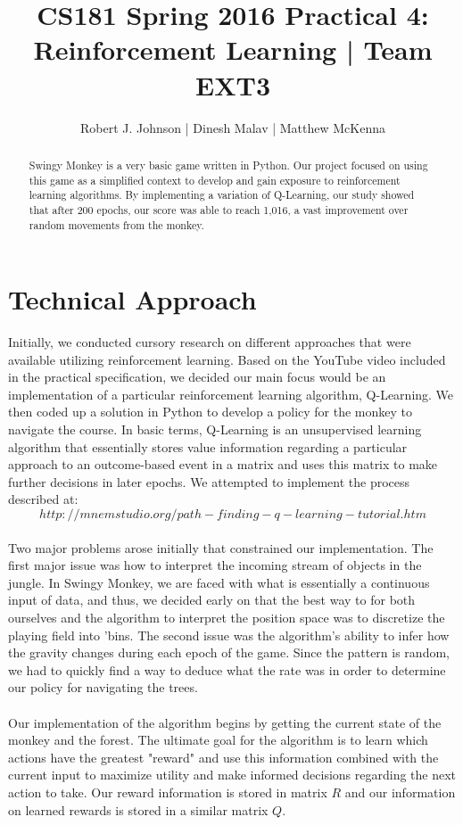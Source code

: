 \documentclass{article}
\begin{document}
\title{CS181 Spring 2016 Practical 4: Reinforcement Learning | Team EXT3}
\author{Robert J. Johnson | Dinesh Malav | Matthew McKenna}


\maketitle

\begin{abstract}
Swingy Monkey is a very basic game written in Python. Our project focused on using this game as a simplified context to develop and gain exposure to reinforcement learning algorithms. By implementing a variation of Q-Learning, our study showed that after 200 epochs, our score was able to reach 1,016, a vast improvement over random movements from the monkey.
\end{abstract}
\section{Technical Approach}
Initially, we conducted cursory research on different approaches that were available utilizing reinforcement learning. Based on the YouTube video included in the practical specification, we decided our main focus would be an implementation of  a particular reinforcement learning algorithm, Q-Learning. We then coded up a solution in Python to develop a policy for the monkey to navigate the course. In basic terms, Q-Learning is an unsupervised learning algorithm that essentially stores value information regarding a particular approach to an outcome-based event in a matrix and uses this matrix to make further decisions in later epochs. We attempted to implement the process described at:
$$http://mnemstudio.org/path-finding-q-learning-tutorial.htm$$\\
Two major problems arose initially that constrained our implementation. The first major issue was how to interpret the incoming stream of objects in the jungle. In Swingy Monkey, we are faced with what is essentially a continuous input of data, and thus, we decided early on that the best way to for both ourselves and the algorithm to interpret the position space was to discretize the playing field into 'bins. The second issue was the algorithm's ability to infer how the gravity changes during each epoch of the game. Since the pattern is random, we had to quickly find a way to deduce what the rate was in order to determine our policy for navigating the trees.\\\\
Our implementation of the algorithm begins by getting the current state of the monkey and the forest. The ultimate goal for the algorithm is to learn which actions have the greatest "reward" and use this information combined with the current input to maximize utility and make informed decisions regarding the next action to take. Our reward information is stored in matrix $R$ and our information on learned rewards is stored in a similar matrix $Q$.\\\\
\end{document}
